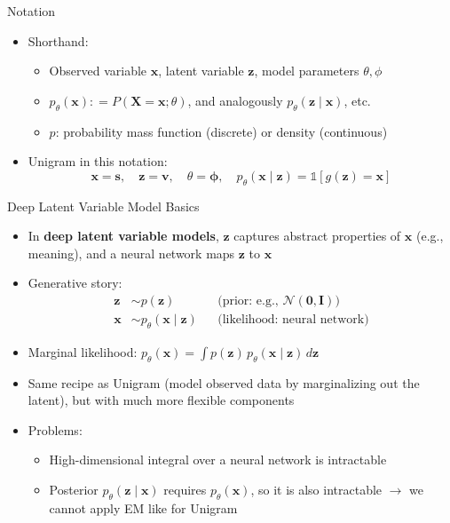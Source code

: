 \documentclass[11pt,compress,t,notes=noshow, xcolor=table]{beamer}
\newcommand{\probs}{\boldsymbol{\phi}}
\providecommand{\bx}{\mathbf{x}}
\providecommand{\bz}{\mathbf{z}}
\begin{document}
\begin{frame}{Notation}
\vfill

\begin{itemize}
\item Shorthand:
\begin{itemize}
\item Observed variable $\bx$, latent variable $\bz$, model parameters $\theta, \phi$
\item $p_\theta(\bx): = P(\mathbf{X} = \bx; \theta)$, and analogously $p_\theta(\bz \mid \bx)$, etc.
\item $p$: probability mass function (discrete) or density (continuous)
\end{itemize}


\item Unigram in this notation:
\begin{equation*}
\bx = \mathbf{s}, \quad \bz = \mathbf{v}, \quad \theta = \probs, \quad p_\theta(\bx \mid \bz) = \mathds{1}[g(\bz) = \bx]
\end{equation*}
\end{itemize}

\vfill

\end{frame}


\begin{frame}{Deep Latent Variable Model Basics}

\vfill

\begin{itemize}
\item In \textbf{deep latent variable models}, $\bz$ captures abstract properties of $\bx$ (e.g., meaning), and a neural network maps $\bz$ to $\bx$
\item Generative story:
\begin{align*}
\bz &\sim p(\bz) && \text{(prior: e.g., } \mathcal{N}(\mathbf{0}, \mathbf{I})\text{)}\\
\bx &\sim p_\theta(\bx \mid \bz) && \text{(likelihood: neural network)}
\end{align*}
\item Marginal likelihood: $p_\theta(\bx) = \int p(\bz)\, p_\theta(\bx \mid \bz)\, d\bz$
\item Same recipe as Unigram (model observed data by marginalizing out the latent), but with much more flexible components
\item Problems:
\begin{itemize}
\item High-dimensional integral over a neural network is intractable
\item Posterior $p_\theta(\bz \mid \bx)$ requires $p_\theta(\bx)$, so it is also intractable $\rightarrow$ we cannot apply EM like for Unigram
\end{itemize}
\end{itemize}

\vfill

\end{frame}
\end{document}
